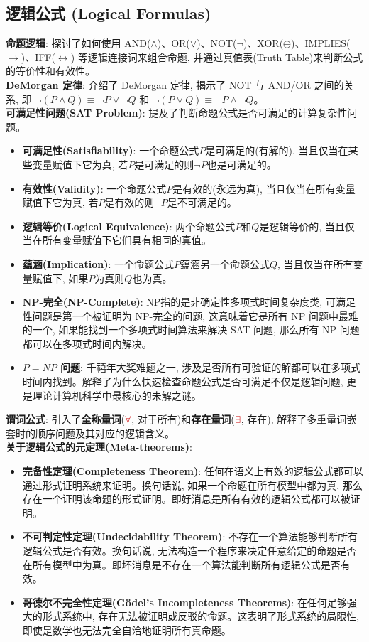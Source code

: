 \documentclass[12pt, a4paper, UTF8]{ctexart}
\newcommand{\term}[1]{\textbf{\textcolor{blue!80!black}{#1}}}
\newcommand{\emphb}[1]{\textbf{#1}}
\newcommand{\mhl}[1]{\textcolor{red!80!black}{#1}}
\begin{document}
\begin{sloppypar}
    \subsection{逻辑公式 (Logical Formulas)}
    \emphb{命题逻辑}: 探讨了如何使用 AND($\wedge$)、OR($\vee$)、NOT($\neg$)、XOR($\oplus$)、IMPLIES($\rightarrow$)、IFF($\leftrightarrow$) 等逻辑连接词来组合命题, 并通过真值表(Truth Table)来判断公式的等价性和有效性。\\
    \term{DeMorgan 定律}: 介绍了 DeMorgan 定律, 揭示了 NOT 与 AND/OR 之间的关系, 即 $\neg (P \wedge Q) \equiv \neg P \vee \neg Q$ 和 $\neg (P \vee Q) \equiv \neg P \wedge \neg Q$。\\
    \emphb{可满足性问题(SAT Problem)}: 提及了判断命题公式是否可满足的计算复杂性问题。
    \begin{itemize}[nosep]
        \item \term{可满足性(Satisfiability)}: 一个命题公式$P$是可满足的(有解的), 当且仅当在某些变量赋值下它为真, 若$P$是可满足的则$\neg P$也是可满足的。
        \item \term{有效性(Validity)}: 一个命题公式$P$是有效的(永远为真), 当且仅当在所有变量赋值下它为真, 若$P$是有效的则$\neg P$是不可满足的。
        \item \term{逻辑等价(Logical Equivalence)}: 两个命题公式$P$和$Q$是逻辑等价的, 当且仅当在所有变量赋值下它们具有相同的真值。
        \item \term{蕴涵(Implication)}: 一个命题公式$P$蕴涵另一个命题公式$Q$, 当且仅当在所有变量赋值下, 如果$P$为真则$Q$也为真。
        \item \term{NP-完全(NP-Complete)}: NP指的是非确定性多项式时间复杂度类, 可满足性问题是第一个被证明为 NP-完全的问题, 这意味着它是所有 NP 问题中最难的一个, 如果能找到一个多项式时间算法来解决 SAT 问题, 那么所有 NP 问题都可以在多项式时间内解决。
        \item \term{$P=NP$ 问题}: 千禧年大奖难题之一, 涉及是否所有可验证的解都可以在多项式时间内找到。解释了为什么快速检查命题公式是否可满足不仅是逻辑问题, 更是理论计算机科学中最核心的未解之谜。
    \end{itemize}
    \emphb{谓词公式}: 引入了\term{全称量词}($\mhl{\forall}$, 对于所有)和\term{存在量词}($\mhl{\exists}$, 存在), 解释了多重量词嵌套时的顺序问题及其对应的逻辑含义。\\
    \emphb{关于逻辑公式的元定理(Meta-theorems)}:
    \begin{itemize}[nosep]
        \item \term{完备性定理(Completeness Theorem)}: 任何在语义上有效的逻辑公式都可以通过形式证明系统来证明。换句话说, 如果一个命题在所有模型中都为真, 那么存在一个证明该命题的形式证明。即好消息是所有有效的逻辑公式都可以被证明。
        \item \term{不可判定性定理(Undecidability Theorem)}: 不存在一个算法能够判断所有逻辑公式是否有效。换句话说, 无法构造一个程序来决定任意给定的命题是否在所有模型中为真。即坏消息是不存在一个算法能判断所有逻辑公式是否有效。
        \item \term{哥德尔不完全性定理(Gödel's Incompleteness Theorems)}: 在任何足够强大的形式系统中, 存在无法被证明或反驳的命题。这表明了形式系统的局限性, 即使是数学也无法完全自洽地证明所有真命题。
    \end{itemize}


\end{sloppypar}
\end{document}
